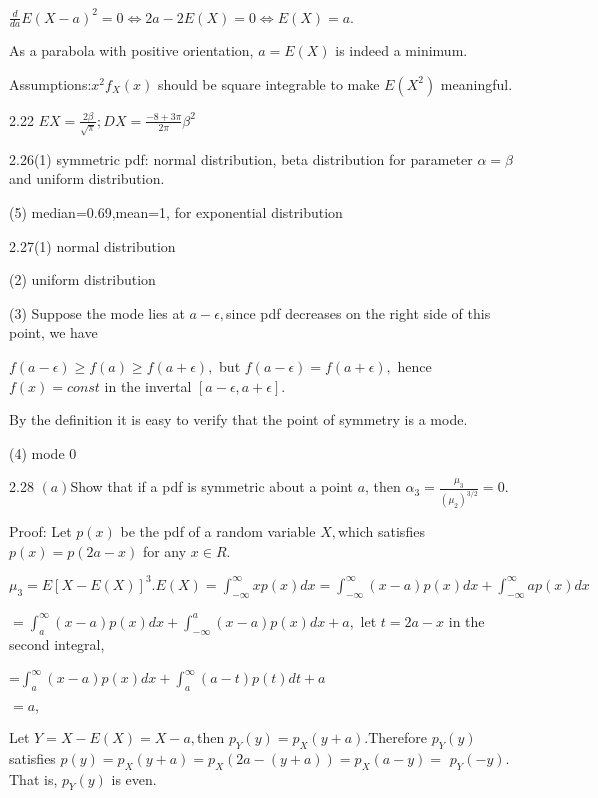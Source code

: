 \documentclass{article}
\begin{document}
$\frac{d}{da}E\left( X-a\right) ^{2}=0\iff 2a-2E\left( X\right) =0\iff
E\left( X\right) =a.$

As a parabola with positive orientation, $a=E\left( X\right) $ is indeed a
minimum.

Assumptions:$x^{2}f_{X}\left( x\right) $ should be square integrable to make 
$E\left( X^{2}\right) $ meaningful. 

2.22 $EX=\frac{2\beta }{\sqrt{\pi }};DX=\frac{-8+3\pi }{2\pi }\beta ^{2}$

2.26(1) symmetric pdf: normal distribution, beta distribution for parameter $%
\alpha =\beta $ and uniform distribution.

\qquad \qquad (5) median=0.69,mean=1, for exponential distribution

2.27(1) normal distribution\qquad \qquad

\qquad \qquad (2) uniform distribution

\qquad \qquad (3) Suppose the mode lies at $a-\epsilon ,$since pdf decreases
on the right side of this point, we have

$f(a-\epsilon )\geq f(a)\geq f(a+\epsilon ),$ but $f(a-\epsilon
)=f(a+\epsilon ),$ hence $f(x)=const$ in the invertal $\left[ a-\epsilon
,a+\epsilon \right] .$

By the definition it is easy to verify that the point of symmetry is a mode.

\qquad \qquad (4) mode 0

2.28 $\left( a\right) $Show that if a pdf is symmetric about a point $a$,
then $\alpha _{3}=\frac{\mu _{3}}{\left( \mu _{2}\right) ^{3/2}}=0.$

Proof: Let $p\left( x\right) $ be the pdf of a random variable $X,$which
satisfies $p\left( x\right) =p\left( 2a-x\right) $ for any $x\in R.$

$\mu _{3}=E\left[ X-E\left( X\right) \right] ^{3}.E\left( X\right)
=\int_{-\infty }^{\infty }xp\left( x\right) dx=\int_{-\infty }^{\infty
}\left( x-a\right) p\left( x\right) dx+\int_{-\infty }^{\infty }ap\left(
x\right) dx$

$=\int_{a}^{\infty }(x-a)p(x)dx+\int_{-\infty }^{a}(x-a)p(x)dx+a,$ let $%
t=2a-x$ in the second integral,

=$\int_{a}^{\infty }(x-a)p(x)dx+\int_{a}^{\infty }(a-t)p(t)dt+a$

$=a,$

Let $Y=X-E\left( X\right) =X-a,$then $p_{Y}\left( y\right) =p_{X}\left(
y+a\right) .$Therefore $p_{Y}\left( y\right) $ satisfies $p\left( y\right)
=p_{X}\left( y+a\right) =p_{X}\left( 2a-\left( y+a\right) \right)
=p_{X}\left( a-y\right) =$ $p_{Y}\left( -y\right) .$ That is, $p_{Y}\left(
y\right) $ is even.
\end{document}
